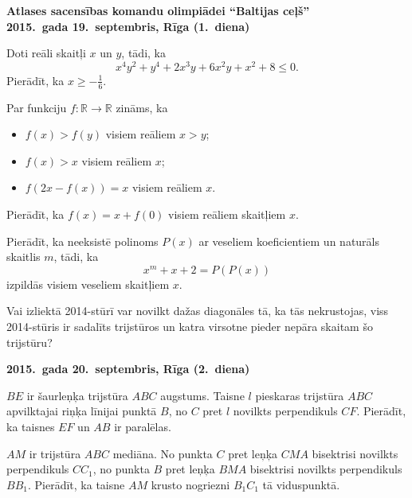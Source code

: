 \documentclass[11pt]{article}
\begin{document}
\begin{center}
{\Large \bf Atlases sacensības komandu olimpiādei ``Baltijas ceļš''}\\
{\bf 2015.\ gada 19.\ septembris, Rīga (1.\ diena)}
\end{center}


\begin{problem}[BwTst2015.1]
Doti reāli skaitļi $x$ un $y$, tādi, ka
\[ x^4y^2 + y^4 + 2x^3y + 6x^2y + x^2 + 8 \leq 0. \]
Pierādīt, ka $x \geq -\frac{1}{6}$. 
\end{problem}

\begin{problem}[BwTst2015.2]
Par funkciju $f: \mathbb{R} \rightarrow \mathbb{R}$ zināms, ka 
\begin{itemize}
\item $f(x) > f(y)$ visiem reāliem $x > y$; 
\item $f(x) > x$ visiem reāliem $x$; 
\item $f(2x - f(x)) = x$ visiem reāliem $x$. 
\end{itemize}
Pierādīt, ka $f(x) = x + f(0)$ visiem reāliem skaitļiem $x$. 
\end{problem}

\begin{problem}[BwTst2015.3]
Pierādīt, ka neeksistē polinoms $P(x)$ ar veseliem koeficientiem un naturāls skaitlis $m$, tādi, ka 
\[ x^m + x + 2 = P(P(x)) \]
izpildās visiem veseliem skaitļiem $x$. 
\end{problem}

\begin{problem}[BwTst2015.4]
Vai izliektā 2014-stūrī var novilkt dažas diagonāles tā, ka tās nekrustojas, 
viss 2014-stūris ir sadalīts trijstūros un katra virsotne pieder nepāra skaitam šo trijstūru?
\end{problem}

\begin{center}
{\bf 2015.\ gada 20.\ septembris, Rīga (2.\ diena)}
\end{center}

\begin{problem}[BwTst2015.5]
$BE$ ir šaurleņķa trijstūra $ABC$ augstums. Taisne $l$ pieskaras trijstūra $ABC$ apvilktajai 
riņķa līnijai punktā $B$, no $C$ pret $l$ novilkts perpendikuls $CF$. Pierādīt, ka 
taisnes $EF$ un $AB$ ir paralēlas. 
\end{problem}

\begin{problem}[BwTst2015.6]
$AM$ ir trijstūra $ABC$ mediāna. No punkta $C$ pret leņķa $CMA$ bisektrisi novilkts perpendikuls $CC_1$, 
no punkta $B$ pret leņķa $BMA$ bisektrisi novilkts perpendikuls $BB_1$. Pierādīt, ka taisne 
$AM$ krusto nogriezni $B_1C_1$ tā viduspunktā. 
\end{problem}
\end{document}
